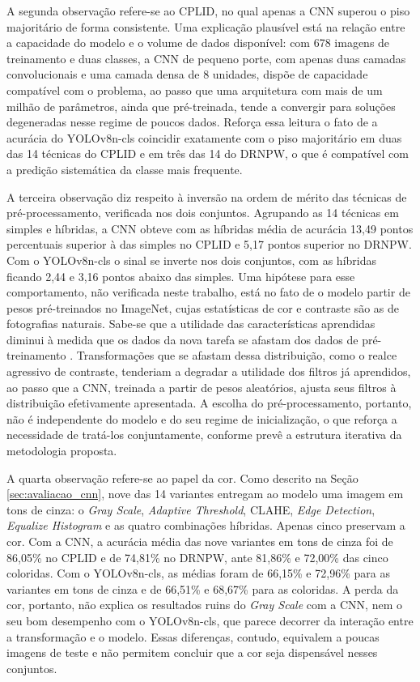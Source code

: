 A segunda observação refere-se ao CPLID, no qual apenas a CNN superou o piso majoritário de forma consistente. Uma explicação plausível está na relação entre a capacidade do modelo e o volume de dados disponível: com 678 imagens de treinamento e duas classes, a CNN de pequeno porte, com apenas duas camadas convolucionais e uma camada densa de 8 unidades, dispõe de capacidade compatível com o problema, ao passo que uma arquitetura com mais de um milhão de parâmetros, ainda que pré-treinada, tende a convergir para soluções degeneradas nesse regime de poucos dados. Reforça essa leitura o fato de a acurácia do YOLOv8n-cls coincidir exatamente com o piso majoritário em duas das 14 técnicas do CPLID e em três das 14 do DRNPW, o que é compatível com a predição sistemática da classe mais frequente.

A terceira observação diz respeito à inversão na ordem de mérito das técnicas de pré-processamento, verificada nos dois conjuntos. Agrupando as 14 técnicas em simples e híbridas, a CNN obteve com as híbridas média de acurácia 13,49 pontos percentuais superior à das simples no CPLID e 5,17 pontos superior no DRNPW. Com o YOLOv8n-cls o sinal se inverte nos dois conjuntos, com as híbridas ficando 2,44 e 3,16 pontos abaixo das simples. Uma hipótese para esse comportamento, não verificada neste trabalho, está no fato de o modelo partir de pesos pré-treinados no ImageNet, cujas estatísticas de cor e contraste são as de fotografias naturais. Sabe-se que a utilidade das características aprendidas diminui à medida que os dados da nova tarefa se afastam dos dados de pré-treinamento \cite{yosinski2014transferable}. Transformações que se afastam dessa distribuição, como o realce agressivo de contraste, tenderiam a degradar a utilidade dos filtros já aprendidos, ao passo que a CNN, treinada a partir de pesos aleatórios, ajusta seus filtros à distribuição efetivamente apresentada. A escolha do pré-processamento, portanto, não é independente do modelo e do seu regime de inicialização, o que reforça a necessidade de tratá-los conjuntamente, conforme prevê a estrutura iterativa da metodologia proposta.

A quarta observação refere-se ao papel da cor. Como descrito na Seção \ref{sec:avaliacao_cnn}, nove das 14 variantes entregam ao modelo uma imagem em tons de cinza: o \textit{Gray Scale}, \textit{Adaptive Threshold}, CLAHE, \textit{Edge Detection}, \textit{Equalize Histogram} e as quatro combinações híbridas. Apenas cinco preservam a cor. Com a CNN, a acurácia média das nove variantes em tons de cinza foi de 86,05\% no CPLID e de 74,81\% no DRNPW, ante 81,86\% e 72,00\% das cinco coloridas. Com o YOLOv8n-cls, as médias foram de 66,15\% e 72,96\% para as variantes em tons de cinza e de 66,51\% e 68,67\% para as coloridas. A perda da cor, portanto, não explica os resultados ruins do \textit{Gray Scale} com a CNN, nem o seu bom desempenho com o YOLOv8n-cls, que parece decorrer da interação entre a transformação e o modelo. Essas diferenças, contudo, equivalem a poucas imagens de teste e não permitem concluir que a cor seja dispensável nesses conjuntos.

